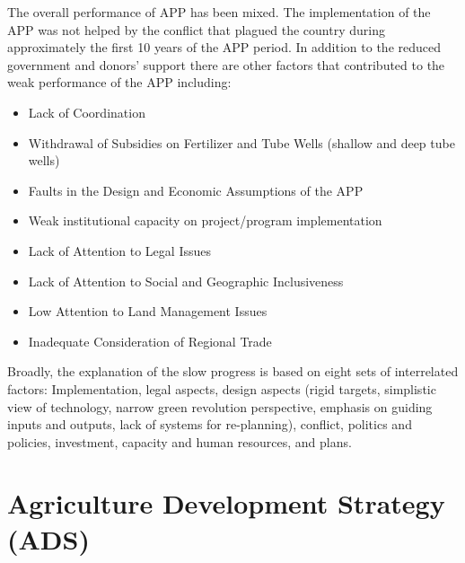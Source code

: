 \documentclass[
  openany]{book}
\providecommand{\tightlist}{%
  \setlength{\itemsep}{0pt}\setlength{\parskip}{0pt}}
\begin{document}
The overall performance of APP has been mixed. The implementation of the APP was not helped by the conflict that plagued the country during approximately the first 10 years of the APP period. In addition to the reduced government and donors' support there are other factors that contributed to the weak performance of the APP including:

\begin{itemize}
\tightlist
\item
  Lack of Coordination
\item
  Withdrawal of Subsidies on Fertilizer and Tube Wells (shallow and deep tube wells)
\item
  Faults in the Design and Economic Assumptions of the APP
\item
  Weak institutional capacity on project/program implementation
\item
  Lack of Attention to Legal Issues
\item
  Lack of Attention to Social and Geographic Inclusiveness
\item
  Low Attention to Land Management Issues
\item
  Inadequate Consideration of Regional Trade
\end{itemize}

Broadly, the explanation of the slow progress is based on eight sets of interrelated factors: Implementation, legal aspects, design aspects (rigid targets, simplistic view of technology, narrow green revolution perspective, emphasis on guiding inputs and outputs, lack of systems for re-planning), conflict, politics and policies, investment, capacity and human resources, and plans.

\hypertarget{agriculture-development-strategy-ads}{%
\section{Agriculture Development Strategy (ADS)}\label{agriculture-development-strategy-ads}}
\end{document}
